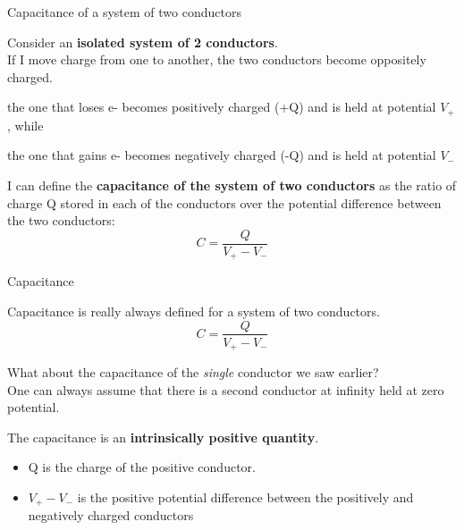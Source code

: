 \begin{frame}{Capacitance of a system of two conductors}

Consider an {\bf isolated system of 2 conductors}.\\

\vspace{0.2cm}
If I move charge from one to another,
the two conductors become oppositely charged.
\begin{itemize}
{\small
  \item the one that loses e- becomes positively charged (+Q) and is held at potential $V_{+}$, while
  \item the one that gains e- becomes negatively charged (-Q) and is held at potential $V_{-}$
}
\end{itemize}

\vspace{0.2cm}

I can define the {\bf capacitance of the system of two conductors} as
the ratio of charge Q stored in each of the conductors over the potential difference between the two conductors:
\begin{equation*}
  C = \frac{Q}{V_{+}-V_{-}}
\end{equation*}

\end{frame}

%
%
%

\begin{frame}{Capacitance}

Capacitance is really always defined for a system of two conductors.
\begin{equation*}
  C = \frac{Q}{V_{+}-V_{-}}
\end{equation*}

What about the capacitance of the {\em single} conductor we saw earlier?\\
One can always assume that there is a second conductor at infinity held at zero potential.\\

\vspace{0.2cm}

The capacitance is an {\bf intrinsically positive quantity}.
\begin{itemize}
  \item Q is the charge of the positive conductor.
  \item $V_{+}-V_{-}$ is the positive potential difference between the positively and negatively charged conductors
\end{itemize}


\end{frame}



